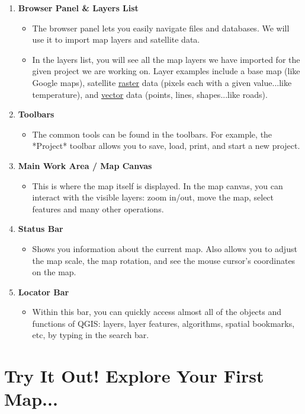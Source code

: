 \documentclass[oneside,a4paper,11pt,explicit]{book}
\begin{document}
\begin{enumerate}
	\item \textbf{Browser Panel \& Layers List}
	\begin{itemize}
		\item The browser panel lets you easily navigate files and databases. We will use it to import map layers and satellite data.
		\item In the layers list, you will see all the map layers we have imported for the given project we are working on. Layer examples include a base map (like Google maps), satellite \href{https://en.wikipedia.org/wiki/Raster_graphics}{raster} data (pixels each with a given value...like temperature), and \href{https://en.wikipedia.org/wiki/Vector_graphics}{vector} data (points, lines, shapes...like roads).
	\end{itemize}
	\item \textbf{Toolbars}
	\begin{itemize}
		\item The common tools can be found in the toolbars. For example, the *Project* toolbar allows you to save, load, print, and start a new project.
	\end{itemize}
	\item \textbf{Main Work Area / Map Canvas}
	\begin{itemize}
		\item This is where the map itself is displayed. In the map canvas, you can interact with the visible layers: zoom in/out, move the map, select features and many other operations.
	\end{itemize}
	\item \textbf{Status Bar}
	\begin{itemize}
		\item Shows you information about the current map. Also allows you to adjust the map scale, the map rotation, and see the mouse cursor's coordinates on the map.
	\end{itemize}
	\item \textbf{Locator Bar}
	\begin{itemize}
		\item Within this bar, you can quickly access almost all of the objects and functions of QGIS: layers, layer features, algorithms, spatial bookmarks, etc, by typing in the search bar.
	\end{itemize}
\end{enumerate}

\section{Try It Out! Explore Your First Map...}
\end{document}
